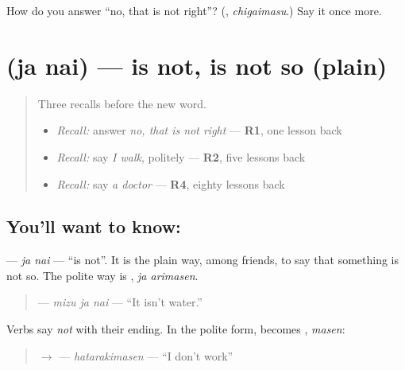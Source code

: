 \begin{tcolorbox}[breakable,colback=teal!4,colframe=teal!35!black,title={Before you move on}]
How do you answer \textquotedblleft{}no, that is not right\textquotedblright{}? (\textbf{}, \emph{chigaimasu}.) Say it once more.
\end{tcolorbox}
\section[\texorpdfstring{\ja{じゃない} (ja nai)}{じゃない (ja nai)}]{ (ja nai) — is not, is not so (plain)}

\label{lesson:JA-C139-janai}



\begin{quote}
Three recalls before the new word.

\begin{itemize}
\raggedright
  \item \emph{Recall:} answer \emph{no, that is not right} — \textbf{R1}, one lesson back
  \item \emph{Recall:} say \emph{I walk}, politely — \textbf{R2}, five lessons back
  \item \emph{Recall:} say \emph{a doctor} — \textbf{R4}, eighty lessons back
\end{itemize}
\end{quote}

\subsection*{You'll want to know: }
\textbf{} — \emph{ja nai} — \textquotedblleft{}is not\textquotedblright{}. It is the plain way, among friends, to say that something is not so. The polite way is \textbf{}, \emph{ja arimasen}.

\begin{quote}
\textbf{} — \emph{mizu ja nai} — \textquotedblleft{}It isn't water.\textquotedblright{}
\end{quote}

Verbs say \emph{not} with their ending. In the polite form, \textbf{} becomes \textbf{}, \emph{masen}:

\begin{quote}
\textbf{} $\to$ \textbf{} — \emph{hatarakimasen} — \textquotedblleft{}I don't work\textquotedblright{}
\end{quote}

